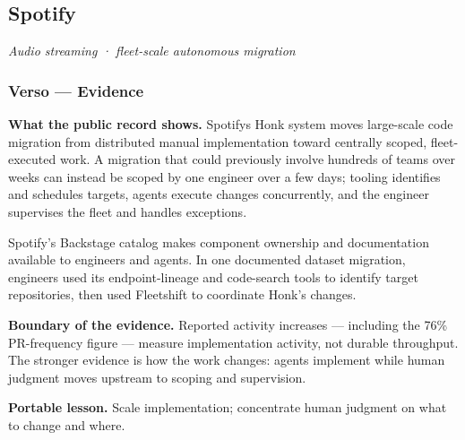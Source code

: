 
\subsection{Spotify}\label{heading:spotify}

\emph{Audio streaming · fleet-scale autonomous migration}

\subsubsection{Verso --- Evidence}\label{heading:verso-evidence}

\textbf{What the public record shows.} Spotify\textquotesingle s Honk system moves large-scale code migration from distributed manual implementation toward centrally scoped, fleet-executed work. A migration that could previously involve hundreds of teams over weeks can instead be scoped by one engineer over a few days; tooling identifies and schedules targets, agents execute changes concurrently, and the engineer supervises the fleet and handles exceptions.\citep{spotify2026honk}

Spotify's Backstage catalog makes component ownership and documentation available to engineers and agents.\citep{spotify2026constraint} In one documented dataset migration, engineers used its endpoint-lineage and code-search tools to identify target repositories, then used Fleetshift to coordinate Honk's changes.\citep{edwardsjoseph2026migrations}

\textbf{Boundary of the evidence.} Reported activity increases --- including the 76\% PR-frequency figure --- measure implementation activity, not durable throughput. The stronger evidence is how the work changes: agents implement while human judgment moves upstream to scoping and supervision.

\textbf{Portable lesson.} Scale implementation; concentrate human judgment on what to change and where.

